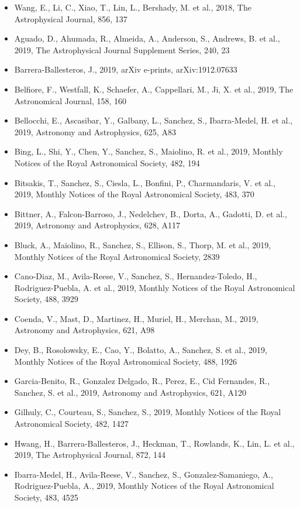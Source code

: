 \documentclass{letter}
\begin{document}
\begin{enumerate}
\begin{itemize}
\item Wang, E., Li, C., Xiao, T., Lin, L., Bershady, M. et al., 2018, The Astrophysical Journal, 856, 137
\item Aguado, D., Ahumada, R., Almeida, A., Anderson, S., Andrews, B. et al., 2019, The Astrophysical Journal Supplement Series, 240, 23
\item Barrera-Ballesteros, J., 2019, arXiv e-prints, arXiv:1912.07633
\item Belfiore, F., Westfall, K., Schaefer, A., Cappellari, M., Ji, X. et al., 2019, The Astronomical Journal, 158, 160
\item Bellocchi, E., Ascasibar, Y., Galbany, L., Sanchez, S., Ibarra-Medel, H. et al., 2019, Astronomy and Astrophysics, 625, A83
\item Bing, L., Shi, Y., Chen, Y., Sanchez, S., Maiolino, R. et al., 2019, Monthly Notices of the Royal Astronomical Society, 482, 194
\item Bitsakis, T., Sanchez, S., Ciesla, L., Bonfini, P., Charmandaris, V. et al., 2019, Monthly Notices of the Royal Astronomical Society, 483, 370
\item Bittner, A., Falcon-Barroso, J., Nedelchev, B., Dorta, A., Gadotti, D. et al., 2019, Astronomy and Astrophysics, 628, A117
\item Bluck, A., Maiolino, R., Sanchez, S., Ellison, S., Thorp, M. et al., 2019, Monthly Notices of the Royal Astronomical Society, 2839
\item Cano-Diaz, M., Avila-Reese, V., Sanchez, S., Hernandez-Toledo, H., Rodriguez-Puebla, A. et al., 2019, Monthly Notices of the Royal Astronomical Society, 488, 3929
\item Coenda, V., Mast, D., Martinez, H., Muriel, H., Merchan, M., 2019, Astronomy and Astrophysics, 621, A98
\item Dey, B., Rosolowsky, E., Cao, Y., Bolatto, A., Sanchez, S. et al., 2019, Monthly Notices of the Royal Astronomical Society, 488, 1926
\item Garcia-Benito, R., Gonzalez Delgado, R., Perez, E., Cid Fernandes, R., Sanchez, S. et al., 2019, Astronomy and Astrophysics, 621, A120
\item Gilhuly, C., Courteau, S., Sanchez, S., 2019, Monthly Notices of the Royal Astronomical Society, 482, 1427
\item Hwang, H., Barrera-Ballesteros, J., Heckman, T., Rowlands, K., Lin, L. et al., 2019, The Astrophysical Journal, 872, 144
\item Ibarra-Medel, H., Avila-Reese, V., Sanchez, S., Gonzalez-Samaniego, A., Rodriguez-Puebla, A., 2019, Monthly Notices of the Royal Astronomical Society, 483, 4525

\end{itemize}
\end{enumerate}
\end{document}
